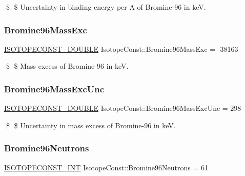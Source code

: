 \$ \$ Uncertainty in binding energy per A of Bromine-\/96 in keV. \mbox{\label{group___isotope_const-_bromine-_br96_ga9a298850a1a4fa0c7c4a124612836357}} 
\subsubsection{\texorpdfstring{Bromine96\+Mass\+Exc}{Bromine96MassExc}}
{\footnotesize\ttfamily \mbox{\hyperlink{group___isotope_const-_macros_ga8f45a7272ce02c0b4c65c44636ed719a}{I\+S\+O\+T\+O\+P\+E\+C\+O\+N\+S\+T\+\_\+\+D\+O\+U\+B\+LE}} Isotope\+Const\+::\+Bromine96\+Mass\+Exc = -\/38163}

\$ \$ Mass excess of Bromine-\/96 in keV. \mbox{\label{group___isotope_const-_bromine-_br96_ga4efc60815e6e1ec70e67a837455255a6}} 
\subsubsection{\texorpdfstring{Bromine96\+Mass\+Exc\+Unc}{Bromine96MassExcUnc}}
{\footnotesize\ttfamily \mbox{\hyperlink{group___isotope_const-_macros_ga8f45a7272ce02c0b4c65c44636ed719a}{I\+S\+O\+T\+O\+P\+E\+C\+O\+N\+S\+T\+\_\+\+D\+O\+U\+B\+LE}} Isotope\+Const\+::\+Bromine96\+Mass\+Exc\+Unc = 298}

\$ \$ Uncertainty in mass excess of Bromine-\/96 in keV. \mbox{\label{group___isotope_const-_bromine-_br96_ga8d802724f240ce89396ad4779f7becb1}} 
\subsubsection{\texorpdfstring{Bromine96\+Neutrons}{Bromine96Neutrons}}
{\footnotesize\ttfamily \mbox{\hyperlink{group___isotope_const-_macros_ga5f18360b3e99483a35c32d789e62621c}{I\+S\+O\+T\+O\+P\+E\+C\+O\+N\+S\+T\+\_\+\+I\+NT}} Isotope\+Const\+::\+Bromine96\+Neutrons = 61}

